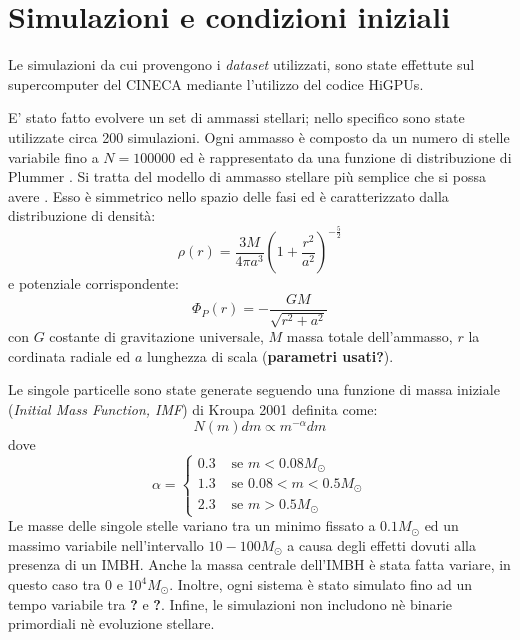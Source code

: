\section{Simulazioni e condizioni iniziali}
Le simulazioni da cui provengono i \textit{dataset} utilizzati, sono state effettute sul supercomputer del CINECA \cite{cineca:online} mediante l'utilizzo del codice HiGPUs.

E' stato fatto evolvere un set di ammassi stellari; nello specifico sono state utilizzate circa 200  simulazioni. Ogni ammasso è composto da un numero di stelle variabile fino a $N=100000$ ed è rappresentato da una funzione di distribuzione di Plummer \cite{plummer:paper}. Si tratta del modello di ammasso stellare più semplice che si possa avere . Esso è simmetrico nello spazio delle fasi ed è caratterizzato dalla distribuzione di densità:
\begin{equation}
\rho(r)=\frac{3 M}{4 \pi a^{3}}\left(1+\frac{r^{2}}{a^{2}}\right)^{-\frac{5}{2}}
\label{eq:plummer}
\end{equation}
e potenziale corrispondente:
\begin{equation}
\Phi_{P}(r)=-\frac{G M}{\sqrt{r^{2}+a^{2}}}
\end{equation}
con $G$ costante di gravitazione universale, $M$ massa totale dell'ammasso, $r$ la cordinata radiale ed $a$ lunghezza di scala (\textbf{parametri usati?}).

Le singole particelle sono state generate seguendo una funzione di massa iniziale (\textit{Initial Mass Function, IMF}) di Kroupa 2001 \cite{kroupa:paper} definita come: 
\begin{equation}
N(m) d m \propto m^{-\alpha} d m
\label{eq:kroupa}
\end{equation}
dove
\begin{equation}
\alpha=\left\{\begin{array}{lll}
0.3 & \text { se } m<0.08 M_{\odot}\\
1.3 & \text { se } 0.08<m<0.5 M_{\odot} \\
2.3 & \text { se } m>0.5 M_{\odot}
\end{array}\right.
\end{equation}
Le masse delle singole stelle variano tra un minimo fissato a $0.1M_{\odot}$ ed un massimo variabile nell'intervallo $10-100M_{\odot}$ a causa degli effetti dovuti alla presenza di un IMBH. Anche la massa centrale dell'IMBH è stata fatta variare, in questo caso tra 0 e $10^{4}M_{\odot}$. Inoltre, ogni sistema è stato simulato fino ad un tempo variabile tra \textbf{?} e \textbf{?}. Infine, le simulazioni non includono nè binarie primordiali nè evoluzione stellare.

